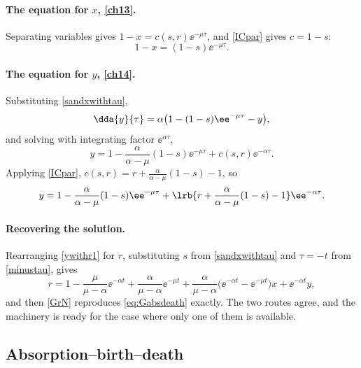 \paragraph{The equation for $x$, \eqref{ch13}.}
Separating variables gives $1-x = c(s,r)\ee^{-\mu\tau}$, and \cref{ICpar} gives
$c = 1-s$:
\begin{equation}
\label{sandxwithtau}
1-x = (1-s)\ee^{-\mu\tau} .
\end{equation}

\paragraph{The equation for $y$, \eqref{ch14}.}
Substituting \cref{sandxwithtau},
\begin{equation*}
\dda{y}{\tau} = \alpha\bigl(1-(1-s)\ee^{-\mu\tau} - y\bigr),
\end{equation*}
and solving with integrating factor $\ee^{\alpha\tau}$,
\begin{equation*}
y = 1 - \frac{\alpha}{\alpha-\mu}(1-s)\ee^{-\mu\tau} + c(s,r)\ee^{-\alpha\tau} .
\end{equation*}
Applying \cref{ICpar}, $c(s,r) = r + \frac{\alpha}{\alpha-\mu}(1-s) - 1$, so
\begin{equation}
\label{ywithr1}
y = 1 - \frac{\alpha}{\alpha-\mu}(1-s)\ee^{-\mu\tau} + \lrb{r + \frac{\alpha}{\alpha-\mu}(1-s) - 1}\ee^{-\alpha\tau}.
\end{equation}

\paragraph{Recovering the solution.}
Rearranging \cref{ywithr1} for $r$, substituting $s$ from \cref{sandxwithtau} and
$\tau=-t$ from \cref{minustau}, gives
\begin{equation*}
r = 1-\frac{\mu}{\mu - \alpha}\ee^{-\alpha t} + \frac{\alpha}{\mu - \alpha}\ee^{-\mu t}
+ \frac{\alpha}{\mu - \alpha}\bigl(\ee^{-\alpha t} - \ee^{-\mu t}\bigr)x + \ee^{-\alpha t}y ,
\end{equation*}
and then \cref{GrN} reproduces \cref{eq:Gabsdeath} exactly. The two routes agree, and
the machinery is ready for the case where only one of them is available.

\subsection{Absorption--birth--death}
\label{sec:absbirthdeath}

